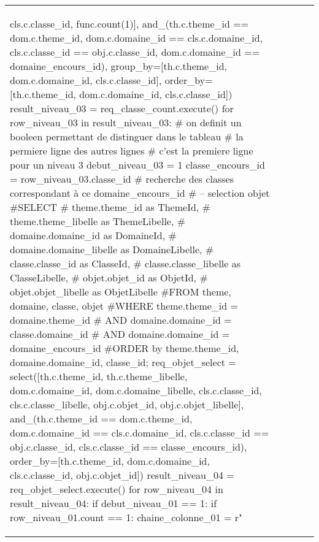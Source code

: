 \documentclass[12pt,titlepage]{book}
\begin{document}
\begin{supertabular}{|p{7.5cm}|p{7.5cm}|p{7.5cm}|c|p{10cm}|}
\begin{lbdpython}
                                 cls.c.classe_id, func.count(1)],
                         and_(th.c.theme_id == dom.c.theme_id,
                              dom.c.domaine_id == cls.c.domaine_id,
                              cls.c.classe_id == obj.c.classe_id,
                              dom.c.domaine_id == domaine_encours_id),
                         group_by=[th.c.theme_id, dom.c.domaine_id, cls.c.classe_id],
                         order_by=[th.c.theme_id, dom.c.domaine_id, cls.c.classe_id])
      result_niveau_03 = req_classe_count.execute()
      for row_niveau_03 in result_niveau_03:
         # on definit un booleen permettant de distinguer dans le tableau
         # la permiere ligne des autres lignes
         # c'est la premiere ligne pour un niveau 3
         debut_niveau_03 = 1
         classe_encours_id = row_niveau_03.classe_id
         # recherche des classes correspondant à ce domaine_encours_id
         # -- selection objet
         #SELECT
         #   theme.theme_id as ThemeId,
         #   theme.theme_libelle as ThemeLibelle,
         #   domaine.domaine_id as DomaineId,
         #   domaine.domaine_libelle as DomaineLibelle,
         #   classe.classe_id as ClasseId,
         #   classe.classe_libelle as ClasseLibelle,
         #   objet.objet_id as ObjetId,
         #   objet.objet_libelle as ObjetLibelle
         #FROM theme, domaine, classe, objet
         #WHERE theme.theme_id = domaine.theme_id
         #  AND domaine.domaine_id = classe.domaine_id
         #  AND domaine.domaine_id = domaine_encours_id
         #ORDER by theme.theme_id, domaine.domaine_id, classe_id;
         req_objet_select = select([th.c.theme_id, th.c.theme_libelle,
                                    dom.c.domaine_id, dom.c.domaine_libelle,
                                    cls.c.classe_id, cls.c.classe_libelle,
                                    obj.c.objet_id, obj.c.objet_libelle],
                              and_(th.c.theme_id == dom.c.theme_id,
                                   dom.c.domaine_id == cls.c.domaine_id,                              
                                   cls.c.classe_id == obj.c.classe_id,                              
                                   cls.c.classe_id == classe_encours_id),
                              order_by=[th.c.theme_id, dom.c.domaine_id, cls.c.classe_id, obj.c.objet_id])
         result_niveau_04 = req_objet_select.execute()
         for row_niveau_04 in result_niveau_04:
            if debut_niveau_01 == 1:
               if row_niveau_01.count == 1:
                  chaine_colonne_01 = r"%

\end{lbdpython}
\end{supertabular}
\end{document}
